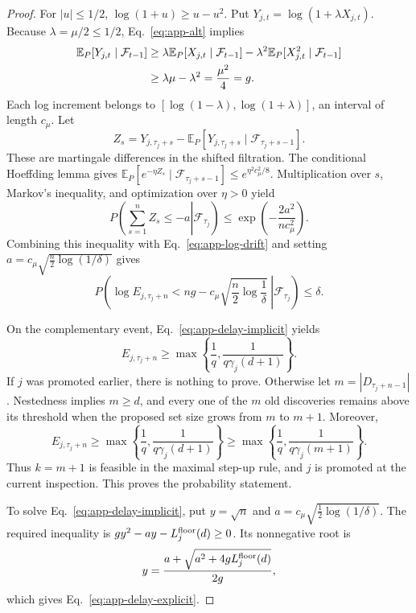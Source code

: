 \begin{proof}
For \(|u|\leq1/2\), \(\log(1+u)\geq u-u^2\).  Put
\(Y_{j,t}=\log(1+\lambda X_{j,t})\).  Because
\(\lambda=\mu/2\leq1/2\), Eq.~\eqref{eq:app-alt} implies
\begin{align}
 \mathbb E_P[Y_{j,t}\mid\mathcal F_{t-1}]
 &\geq
 \lambda\mathbb E_P[X_{j,t}\mid\mathcal F_{t-1}]
 -\lambda^2\mathbb E_P[X_{j,t}^2\mid\mathcal F_{t-1}]
 \notag\\
 &\geq\lambda\mu-\lambda^2
 =\frac{\mu^2}{4}=g.
 \label{eq:app-log-drift}
\end{align}
Each log increment belongs to
\([\log(1-\lambda),\log(1+\lambda)]\), an interval of length \(c_\mu\).
Let
\[
 Z_s=Y_{j,\tau_j+s}
 -\mathbb E_P[Y_{j,\tau_j+s}\mid\mathcal F_{\tau_j+s-1}].
\]
These are martingale differences in the shifted filtration.  The conditional
Hoeffding lemma gives
\(\mathbb E_P[e^{-\eta Z_s}\mid\mathcal F_{\tau_j+s-1}]
\leq e^{\eta^2c_\mu^2/8}\).  Multiplication over \(s\), Markov's inequality,
and optimization over \(\eta>0\) yield
\[
 P\!\left(
   \left.\sum_{s=1}^nZ_s\leq-a\right|\mathcal F_{\tau_j}\right)
 \leq\exp\!\left(-\frac{2a^2}{nc_\mu^2}\right).
\]
Combining this inequality with Eq.~\eqref{eq:app-log-drift} and setting
\(a=c_\mu\sqrt{\tfrac n2\log(1/\delta)}\) gives
\begin{equation}
 P\!\left(
 \left.
 \log E_{j,\tau_j+n}
 <ng-c_\mu\sqrt{\frac n2\log\frac1\delta}
 \ \right|\mathcal F_{\tau_j}\right)\leq\delta.
 \label{eq:app-log-concentration}
\end{equation}

On the complementary event, Eq.~\eqref{eq:app-delay-implicit} yields
\[
E_{j,\tau_j+n}\geq
 \max\!\left\{\frac1q,\frac{1}{q\gamma_j(d+1)}\right\}.
\]
If \(j\) was promoted earlier, there is nothing to prove.  Otherwise let
\(m=|D_{\tau_j+n-1}|\).  Nestedness implies \(m\geq d\), and every one of
the \(m\) old discoveries remains above its threshold when the proposed set
size grows from \(m\) to \(m+1\).  Moreover,
\[
 E_{j,\tau_j+n}
 \geq\max\!\left\{\frac1q,\frac{1}{q\gamma_j(d+1)}\right\}
 \geq\max\!\left\{\frac1q,\frac{1}{q\gamma_j(m+1)}\right\}.
\]
Thus \(k=m+1\) is feasible in the maximal step-up rule, and \(j\) is
promoted at the current inspection.  This proves the probability statement.

To solve Eq.~\eqref{eq:app-delay-implicit}, put \(y=\sqrt n\) and
\(a=c_\mu\sqrt{\tfrac12\log(1/\delta)}\).  The required inequality is
\(gy^2-ay-L_j^{\rm floor}(d)\geq0\).  Its nonnegative root is
\[
 y=\frac{a+\sqrt{a^2+4gL_j^{\rm floor}(d)}}{2g},
\]
which gives Eq.~\eqref{eq:app-delay-explicit}.
\end{proof}

